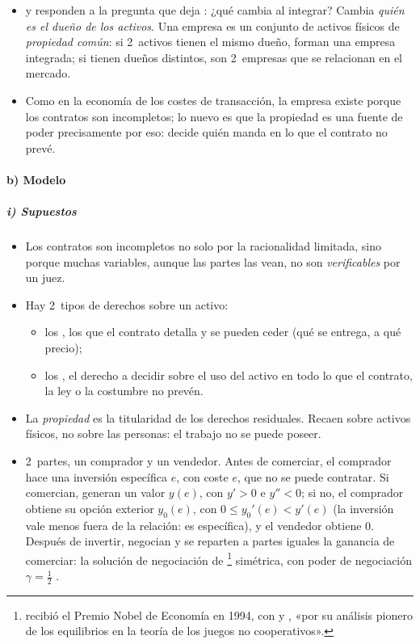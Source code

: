 \documentclass[11pt]{article}
\begin{document}
\begin{itemize}
\item \textcite{GrossmanHart1986Costs} y \textcite{HartMoore1990Property} responden a la pregunta que deja : ¿qué cambia al integrar? Cambia \emph{quién es el dueño de los activos}. Una empresa es un conjunto de activos físicos de \emph{propiedad común}: si 2~activos tienen el mismo dueño, forman una empresa integrada; si tienen dueños distintos, son 2~empresas que se relacionan en el mercado.
\item Como en la economía de los costes de transacción, la empresa existe porque los contratos son incompletos; lo nuevo es que la propiedad es una fuente de poder precisamente por eso: decide quién manda en lo que el contrato no prevé.
\end{itemize}

\paragraph{b) Modelo}

\subparagraph{i) Supuestos}

\begin{itemize}
\item Los contratos son incompletos no solo por la racionalidad limitada, sino porque muchas variables, aunque las partes las vean, no son \emph{verificables} por un juez.
\item Hay 2~tipos de derechos sobre un activo:
  \begin{itemize}
  \item los , los que el contrato detalla y se pueden ceder (qué se entrega, a qué precio);
  \item los , el derecho a decidir sobre el uso del activo en todo lo que el contrato, la ley o la costumbre no prevén\nocite{Hart1995Firms}.
  \end{itemize}
\item La \emph{propiedad} es la titularidad de los derechos residuales. Recaen sobre activos físicos, no sobre las personas: el trabajo no se puede poseer.
\item 2~partes, un comprador y un vendedor. Antes de comerciar, el comprador hace una inversión específica $e$, con coste $e$, que no se puede contratar. Si comercian, generan un valor $y(e)$, con $y'>0$ e $y''<0$; si no, el comprador obtiene su opción exterior $y_0(e)$, con $0\leq y_0'(e)<y'(e)$ (la inversión vale menos fuera de la relación: es específica), y el vendedor obtiene 0. Después de invertir, negocian y se reparten a partes iguales la ganancia de comerciar: la solución de negociación de \footnote{ recibió el Premio Nobel de Economía en 1994, con  y , «por su análisis pionero de los equilibrios en la teoría de los juegos no cooperativos»\nocite{Nobel1994Nash}.} simétrica, con poder de negociación $\gamma=\tfrac12$\nocite{Nash1950Bargaining} .
\end{itemize}
\end{document}
